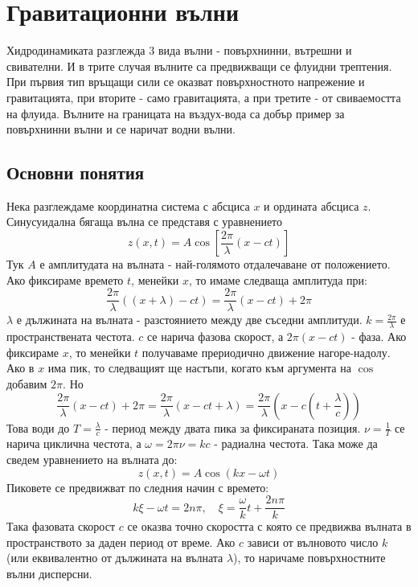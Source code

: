\setcounter{equation}{0}
\section{Гравитационни вълни}
Хидродинамиката разглежда 3 вида вълни - повърхнинни, вътрешни и свивателни.
И в трите случая вълните са предвижващи се флуидни трептения.
При първия тип връщащи сили се оказват повърхностното напрежение и гравитацията,
при вторите - само гравитацията, а при третите - от свиваемостта на флуида.
Вълните на границата на въздух-вода са добър пример за повърхнинни вълни и се наричат водни вълни.

\subsection{Основни понятия}
Нека разглеждаме координатна система с абсциса $x$ и ордината абсциса $z$.
Синусуидална бягаща вълна се представя с уравнението
\begin{equation}
	z(x,t) = A \cos \left[\frac{2 \pi}{\lambda}(x - c t)\right]
\end{equation}
Тук $A$ е амплитудата на вълната - най-голямото отдалечаване от положението.
Ако фиксираме времето $t$, менейки $x$, то имаме следваща амплитуда при:
\begin{equation}
	\frac{2 \pi}{\lambda}((x + \lambda) - c t) = \frac{2 \pi}{\lambda}(x - c t) + 2 \pi
\end{equation}
$\lambda$ е дължината на вълната - разстоянието между две съседни амплитуди.
$k = \frac{2 \pi}{\lambda}$ е пространствената честота.
$c$ се нарича фазова скорост, а $2 \pi (x - c t)$ - фаза.
Ако фиксираме $x$, то менейки $t$ получаваме прериодично движение нагоре-надолу.
Ако в $x$ има пик, то следващият ще настъпи, когато към аргумента на $\cos$ добавим $2 \pi$.
Но 
\begin{equation}
	\frac{2 \pi}{\lambda}(x - c t) + 2 \pi = \frac{2 \pi}{\lambda}(x - c t + \lambda) = \frac{2 \pi}{\lambda}(x - c (t + \frac{\lambda}{c}))
\end{equation}
Това води до $T = \frac{\lambda}{c}$ - период между двата пика за фиксираната позиция.
$\nu = \frac{1}{T}$ се нарича циклична честота, а $\omega = 2 \pi \nu = k c$ - радиална честота.
Така може да сведем уравнението на вълната до:
\begin{equation}
	z(x,t) = A \cos (k x - \omega t)
\end{equation}
Пиковете се предвижват по следния начин с времето:
\begin{equation}
	k \xi - \omega t = 2 n \pi, \quad \xi = \frac{\omega}{k} t + \frac{2 n \pi}{k} 
\end{equation}
Така фазовата скорост $c$ се оказва точно скоростта с която се предвижва вълната в пространството за даден период от време. 
Ако $c$ зависи от вълновото число $k$ (или еквивалентно от дължината на вълната $\lambda$), то наричаме повърхностните вълни дисперсни.


